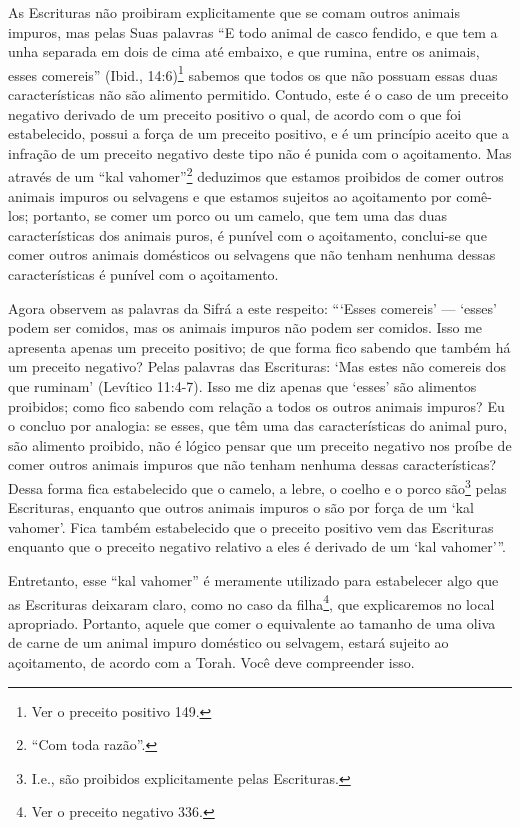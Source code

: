 As Escrituras não proibiram explicitamente que se comam outros animais
impuros, mas pelas Suas palavras ``E todo animal de casco fendido, e que
tem a unha separada em dois de cima até embaixo, e que rumina, entre os
animais, esses comereis'' (Ibid., 14:6)\footnote{Ver o preceito positivo 149.} sabemos
que todos os que não possuam essas duas características não são alimento
permitido. Contudo, este é o caso de um preceito negativo derivado de um
preceito positivo o qual, de acordo com o que foi estabelecido, possui a
força de um preceito positivo, e é um princípio aceito que a infração de
um preceito negativo deste tipo não é punida com o açoitamento. Mas
através de um ``kal vahomer''\footnote{``Com toda razão''.} deduzimos que
estamos proibidos de comer outros animais impuros ou selvagens e que
estamos sujeitos ao açoitamento por comê-los; portanto, se comer um
porco ou um camelo, que tem uma das duas características dos animais
puros, é punível com o açoitamento, conclui-se que comer outros animais
domésticos ou selvagens que não tenham nenhuma dessas características é
punível com o açoitamento.

Agora observem as palavras da Sifrá a este respeito: ```Esses comereis'
--- `esses' podem ser comidos, mas os animais impuros não podem ser
comidos. Isso me apresenta apenas um preceito positivo; de que forma
fico sabendo que também há um preceito negativo? Pelas palavras das
Escrituras: `Mas estes não comereis dos que ruminam' (Levítico 11:4-7).
Isso me diz apenas que `esses' são alimentos proibidos; como fico
sabendo com relação a todos os outros animais impuros? Eu o concluo por
analogia: se esses, que têm uma das características do animal puro, são
alimento proibido, não é lógico pensar que um preceito negativo nos
proíbe de comer outros animais impuros que não tenham nenhuma dessas
características? Dessa forma fica estabelecido que o camelo, a lebre, o
coelho e o porco são\footnote{I.e., são proibidos explicitamente pelas Escrituras.} pelas Escrituras, enquanto
que outros animais impuros o são por força de um `kal vahomer'. Fica
também estabelecido que o preceito positivo vem das Escrituras enquanto
que o preceito negativo relativo a eles é derivado de um `kal
vahomer'''.

Entretanto, esse ``kal vahomer'' é meramente utilizado para estabelecer
algo que as Escrituras deixaram claro, como no caso da
filha\footnote{Ver o preceito negativo 336.}, que explicaremos no local apropriado.
Portanto, aquele que comer o equivalente ao tamanho de uma oliva de
carne de um animal impuro doméstico ou selvagem, estará sujeito ao
açoitamento, de acordo com a Torah. Você deve compreender isso.


